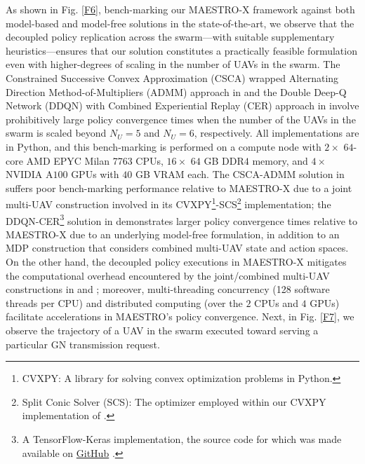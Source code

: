 \documentclass[12pt, draftcls, onecolumn]{IEEEtran}
\theoremstyle{plain}
\theoremstyle{definition}
\theoremstyle{remark}
\begin{document}
As shown in Fig. \ref{F6}, bench-marking our MAESTRO-X framework against both model-based \cite{CSCA-ADMM} and model-free \cite{DDQN} solutions in the state-of-the-art, we observe that the decoupled policy replication across the swarm---with suitable supplementary heuristics---ensures that our solution constitutes a practically feasible formulation even with higher-degrees of scaling in the number of UAVs in the swarm. The Constrained Successive Convex Approximation (CSCA) wrapped Alternating Direction Method-of-Multipliers (ADMM) approach in \cite{CSCA-ADMM} and the Double Deep-Q Network (DDQN) with Combined Experiential Replay (CER) approach in \cite{DDQN} involve prohibitively large policy convergence times when the number of the UAVs in the swarm is scaled beyond $N_{U}{=}5$ and $N_{U}{=}6$, respectively. All implementations are in Python, and this bench-marking is performed on a compute node with $2{\times}$ $64$-core AMD EPYC Milan 7763 CPUs, $16{\times}$ $64$ GB DDR$4$ memory, and $4{\times}$ NVIDIA A$100$ GPUs with $40$ GB VRAM each. The CSCA-ADMM solution in \cite{CSCA-ADMM} suffers poor bench-marking performance relative to MAESTRO-X due to a joint multi-UAV construction involved in its CVXPY\footnote{CVXPY: A library for solving convex optimization problems in Python.}-SCS\footnote{Split Conic Solver (SCS): The optimizer employed within our CVXPY implementation of \cite{CSCA-ADMM}.} implementation; the DDQN-CER\footnote{A TensorFlow-Keras implementation, the source code for which was made available on \href{https://github.com/hbayerlein/uav_data_harvesting.git}{GitHub} \cite{DDQN}.} solution in \cite{DDQN} demonstrates larger policy convergence times relative to MAESTRO-X due to an underlying model-free formulation, in addition to an MDP construction that considers combined multi-UAV state and action spaces. On the other hand, the decoupled policy executions in MAESTRO-X mitigates the computational overhead encountered by the joint/combined multi-UAV constructions in \cite{CSCA-ADMM} and \cite{DDQN}; moreover, multi-threading concurrency (128 software threads per CPU) and distributed computing (over the $2$ CPUs and $4$ GPUs) facilitate accelerations in MAESTRO's policy convergence. Next, in Fig. \ref{F7}, we observe the trajectory of a UAV in the swarm executed toward serving a particular GN transmission request.
\end{document}
